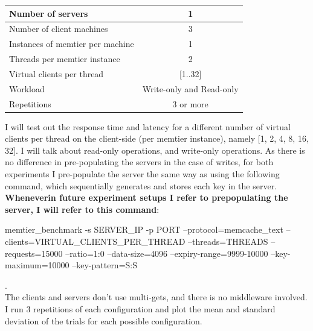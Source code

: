 \documentclass[11pt,a4paper]{article}
\begin{document}
\begin{center}
	\scriptsize{
		\begin{tabular}{|l|c|}
			\hline Number of servers                & 1                        \\ 
			\hline Number of client machines        & 3                        \\ 
			\hline Instances of memtier per machine & 1                        \\ 
			\hline Threads per memtier instance     & 2                        \\
			\hline Virtual clients per thread       & [1..32]                  \\ 
			\hline Workload                         & Write-only and Read-only \\
			\hline Repetitions                      & 3 or more                \\ 
			\hline 
		\end{tabular}
	} 
\end{center}

I will test out the response time and latency for a different number of virtual clients per thread on the client-side (per memtier instance), namely [1, 2, 4, 8, 16, 32].
I will talk about read-only operations, and write-only operations.
As there is no difference in pre-populating the servers in the case of writes, for both experiments I pre-populate the server the same way as using the following command, which sequentially generates and stores each key in the server.
\textbf{Wheneverin future experiment setups  I refer to prepopulating the server, I will refer to this command}:

\begin{spverbatim}
      memtier_benchmark -s {SERVER_IP} -p {PORT}
      --protocol=memcache_text --clients={VIRTUAL_CLIENTS_PER_THREAD} --threads={THREADS}
      --requests=15000 --ratio=1:0 --data-size=4096
     --expiry-range=9999-10000 --key-maximum=10000 --key-pattern=S:S
\end{spverbatim}
.\\
The clients and servers don't use multi-gets, and there is no middleware involved.
I run 3 repetitions of each configuration and plot the mean and standard deviation of the trials for each possible configuration. \\
\end{document}
